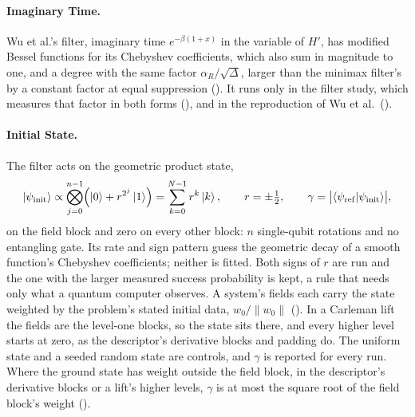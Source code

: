 \paragraph{Imaginary Time.} Wu et al.'s filter, imaginary time $e^{-\beta(1+x)}$ in the variable of $H'$, has modified Bessel functions for its Chebyshev coefficients, which also sum in magnitude to one, and a degree with the same factor $\alpha_R/\sqrt\Delta$, larger than the minimax filter's by a constant factor at equal suppression (). It runs only in the filter study, which measures that factor in both forms (), and in the reproduction of Wu et al.\ ().

\paragraph{Initial State.} The filter acts on the geometric product state,
\begin{equation}
    \ket{\psi_{\mathrm{init}}}\propto\bigotimes_{j=0}^{n-1}\Bigl(\ket{0}+r^{2^j}\ket{1}\Bigr)=\sum_{k=0}^{N-1}r^k\ket{k},
    \qquad
    r=\pm\tfrac12,
    \qquad
    \gamma=\bigl|\braket{\psi_{\mathrm{ref}}|\psi_{\mathrm{init}}}\bigr| ,
    \label{eq:geometric-state}
\end{equation}
on the field block and zero on every other block: $n$ single-qubit rotations and no entangling gate. Its rate and sign pattern guess the geometric decay of a smooth function's Chebyshev coefficients; neither is fitted. Both signs of $r$ are run and the one with the larger measured success probability is kept, a rule that needs only what a quantum computer observes. A system's fields each carry the state weighted by the problem's stated initial data, $w_0/\|w_0\|$ (). In a Carleman lift the fields are the level-one blocks, so the state sits there, and every higher level starts at zero, as the descriptor's derivative blocks and padding do. The uniform state and a seeded random state are controls, and $\gamma$ is reported for every run. Where the ground state has weight outside the field block, in the descriptor's derivative blocks or a lift's higher levels, $\gamma$ is at most the square root of the field block's weight ().

